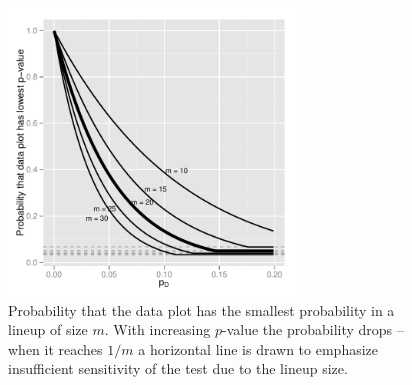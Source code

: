 \documentclass[12pt]{article}
\begin{document}
\begin{figure}[htbp] %
   \centering
   \includegraphics[width=3in]{images/powerplot.pdf} 
   \caption{Probability that the data plot has the smallest probability in a lineup of size $m$. With increasing $p$-value the probability drops -- when it reaches $1/m$ a horizontal line is drawn to emphasize insufficient sensitivity of the test due to the lineup size. 
}
   \label{fig:pval_power}
\end{figure}
\end{document}
